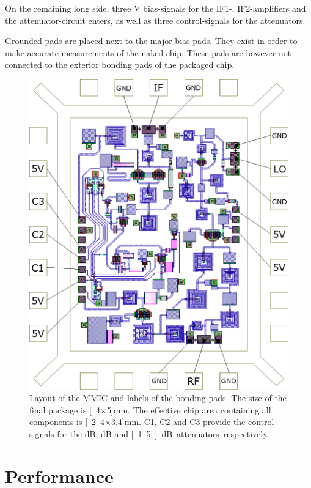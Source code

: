 		On the remaining long side, three \unit[5]{V} bias-signals for the IF1-, IF2-amplifiers and the attenuator-circuit enters, as well as three control-signals for the attenuators.
		
		Grounded pads are placed next to the major bias-pads. They exist in order to make accurate measurements of the naked chip. These pads are however not connected to the exterior bonding pads of the packaged chip.

		\begin{figure}[hbt!]
			\centering
			\includegraphics[width=1.0\textwidth]{fig/summary/package}
			\caption[Layout of the pad-structure.]{Layout of the MMIC and labels of the bonding pads. The size of the final package is \unit[4$\times$5]{mm}. The effective chip area containing all components is \unit[2.4$\times$3.4]{mm}. C1, C2 and C3 provide the control signals for the \unit[6]{dB}, \unit[3]{dB} and \unit[1.5]{dB} attenuators respectively.}\label{fig:final_chip}
		\end{figure}

	\section{Performance}
